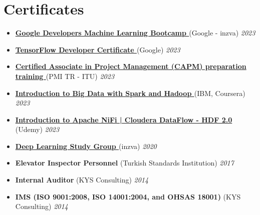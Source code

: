 \documentclass[a4paper,11pt]{article}
\begin{document}
\section{\textbf{Certificates}}
\begin{itemize}[leftmargin=3ex, rightmargin=0.05in, noitemsep, labelsep=1.2mm, itemsep=0mm]
  \item \textbf{\href{https://drive.google.com/file/d/1N--h3AGFV5L6Tol1YEKt_5QPHIgllQqC/view?usp=sharing}{Google Developers Machine Learning Bootcamp \faLink}} (Google - inzva) \hfill \textit{2023}
  
  \item \textbf{\href{https://www.credential.net/78698ddb-f853-4163-9af0-e40f4d96717f\#gs.1yymvq}{TensorFlow Developer Certificate
 \faLink}} (Google) \hfill \textit{2023}
  
  \item \textbf{\href{https://drive.google.com/file/d/1U9PDKF2VjfbU_4dwTCZzbb_OPgitSXx2/view?usp=sharing}{Certified Associate in Project Management (CAPM) preparation training \faLink}} (PMI TR - ITU) \hfill \textit{2023}
  \item \textbf{\href{https://coursera.org/share/da44f3f69bf49ddc780589dbe1deafd8}{Introduction to Big Data with Spark and Hadoop \faLink}} (IBM, Coursera) \hfill \textit{2023}
  \item \textbf{\href{https://www.udemy.com/certificate/UC-f103e3b8-b3de-4776-a95f-a03c73fb5471/}{Introduction to Apache NiFi | Cloudera DataFlow - HDF 2.0 \faLink}} (Udemy) \hfill \textit{2023}
  \item \textbf{\href{https://drive.google.com/file/d/1LEM8BB5aomFk3PW2wjwMFJ9eKqAEkD6s/view?usp=sharing}{Deep Learning Study Group \faLink}} (inzva) \hfill \textit{2020}
  \item \textbf{Elevator Inspector Personnel} (Turkish Standards Institution) \hfill \textit{2017}
  \item \textbf{Internal Auditor} (KYS Consulting) \hfill \textit{2014}
  \item \textbf{IMS (ISO 9001:2008, ISO 14001:2004, and OHSAS 18001)} (KYS Consulting) \hfill \textit{2014}
\end{itemize}


\end{document}
